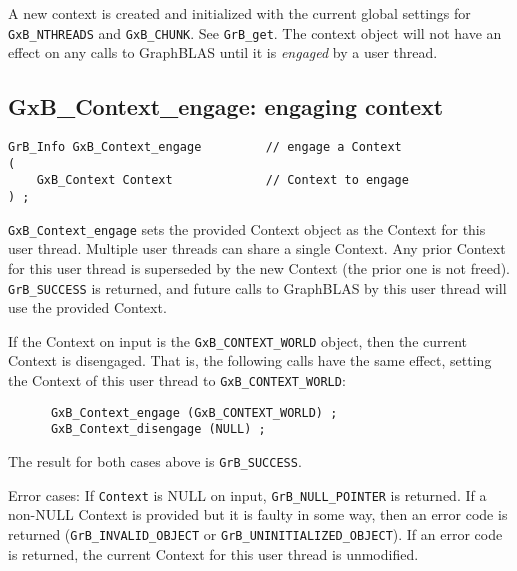 \documentclass[12pt]{article}
\begin{document}
A new context is created and initialized with the current global settings for
\verb'GxB_NTHREADS' and \verb'GxB_CHUNK'.  See \verb'GrB_get'.
The context object will not have an effect on any calls to GraphBLAS until it
is {\em engaged} by a user thread.

\newpage
\subsection{{\sf GxB\_Context\_engage:}  engaging context}
\label{context_engage}

\begin{mdframed}[userdefinedwidth=6in]
{\footnotesize
\begin{verbatim}
GrB_Info GxB_Context_engage         // engage a Context
(
    GxB_Context Context             // Context to engage
) ;
\end{verbatim} } \end{mdframed}

\verb'GxB_Context_engage' sets the provided Context object as the Context for
this user thread.  Multiple user threads can share a single Context.  Any prior
Context for this user thread is superseded by the new Context (the prior one is
not freed).  \verb'GrB_SUCCESS' is returned, and future calls to GraphBLAS by
this user thread will use the provided Context.

If the Context on input is the \verb'GxB_CONTEXT_WORLD' object, then the
current Context is disengaged.  That is, the following calls have the same
effect, setting the Context of this user thread to \verb'GxB_CONTEXT_WORLD':

{\footnotesize
\begin{verbatim}
      GxB_Context_engage (GxB_CONTEXT_WORLD) ;
      GxB_Context_disengage (NULL) ;
\end{verbatim} }

The result for both cases above is \verb'GrB_SUCCESS'.

Error cases: If \verb'Context' is NULL on input, \verb'GrB_NULL_POINTER' is
returned.  If a non-NULL Context is provided but it is faulty in some way, then
an error code is returned (\verb'GrB_INVALID_OBJECT' or
\verb'GrB_UNINITIALIZED_OBJECT').  If an error code is returned, the current
Context for this user thread is unmodified.

\end{document}
